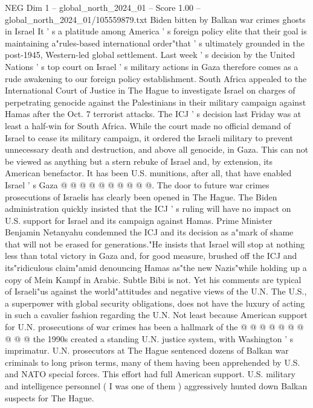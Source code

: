 \begin{textsample}{NEG Dim 1 – global\_north\_2024\_01 – Score 1.00 – global\_north\_2024\_01/105559879.txt}  \label{ex:f1_neg_331}
Biden bitten by Balkan war crimes ghosts in Israel It ' s a platitude among America ' s foreign policy elite that their goal is maintaining a"rules-based international order"that ' s ultimately grounded in the post-1945, Western-led global settlement.
Last week ' s decision by the United Nations ' s top court on Israel ' s military actions in Gaza therefore comes as a rude awakening to our foreign policy establishment.
South Africa appealed to the International Court of Justice in The Hague to investigate Israel on charges of perpetrating genocide against the Palestinians in their military campaign against Hamas after the Oct. 7 terrorist attacks.
The ICJ ' s decision last Friday was at least a half-win for South Africa.
While the court made no official demand of Israel to cease its military campaign, it ordered the Israeli military to prevent unnecessary death and destruction, and above all genocide, in Gaza.
This can not be viewed as anything but a stern rebuke of Israel and, by extension, its American benefactor.
It has been U.S. munitions, after all, that have enabled Israel ' s Gaza @ @ @ @ @ @ @ @ @ @.
The door to future war crimes prosecutions of Israelis has clearly been opened in The Hague.
The Biden administration quickly insisted that the ICJ ' s ruling will have no impact on U.S. support for Israel and its campaign against Hamas.
Prime Minister Benjamin Netanyahu condemned the ICJ and its decision as a"mark of shame that will not be erased for generations."He insists that Israel will stop at nothing less than total victory in Gaza and, for good measure, brushed off the ICJ and its"ridiculous claim"amid denouncing Hamas as"the new Nazis"while holding up a copy of Mein Kampf in Arabic.
Subtle Bibi is not.
Yet his comments are typical of Israeli"us against the world"attitudes and negative views of the U.N.
The U.S., a superpower with global security obligations, does not have the luxury of acting in such a cavalier fashion regarding the U.N.
Not least because American support for U.N. prosecutions of war crimes has been a hallmark of the @ @ @ @ @ @ @ @ @ @ the 1990s created a standing U.N. justice system, with Washington ' s imprimatur.
U.N. prosecutors at The Hague sentenced dozens of Balkan war criminals to long prison terms, many of them having been apprehended by U.S. and NATO special forces.
This effort had full American support.
U.S. military and intelligence personnel ( I was one of them ) aggressively hunted down Balkan suspects for The Hague.

\end{textsample}
